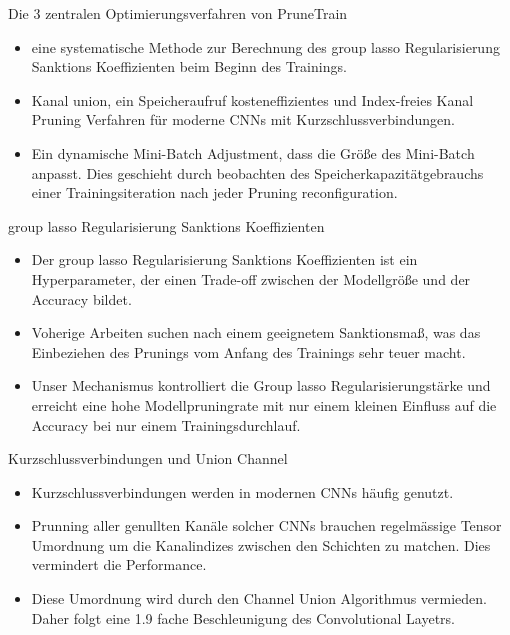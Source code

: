 \documentclass[10pt]{beamer}
\begin{document}
\begin{frame}{Die 3 zentralen Optimierungsverfahren von PruneTrain}
  \begin{itemize}
   \item eine systematische Methode zur Berechnung des group lasso Regularisierung Sanktions Koeffizienten beim Beginn des Trainings.
   \item Kanal union, ein Speicheraufruf kosteneffizientes und Index-freies Kanal Pruning Verfahren für moderne CNNs mit Kurzschlussverbindungen.
   \item Ein dynamische Mini-Batch Adjustment, dass die Größe des Mini-Batch anpasst. Dies geschieht durch beobachten des Speicherkapazitätgebrauchs einer Trainingsiteration nach jeder Pruning reconfiguration.
  \end{itemize} 
  \end{frame}


\begin{frame}{group lasso Regularisierung Sanktions Koeffizienten}
\begin{itemize}
 \item Der group lasso Regularisierung Sanktions Koeffizienten ist ein Hyperparameter, der einen Trade-off  zwischen der Modellgröße und der Accuracy bildet.
 \item Voherige Arbeiten suchen nach einem geeignetem Sanktionsmaß, was das Einbeziehen des Prunings vom Anfang des Trainings sehr teuer macht.
 \item Unser Mechanismus kontrolliert die Group lasso Regularisierungstärke und erreicht eine hohe Modellpruningrate mit nur einem kleinen Einfluss auf die Accuracy bei nur einem Trainingsdurchlauf.
\end{itemize}
\end{frame}


\begin{frame}{Kurzschlussverbindungen und Union Channel}
\begin{itemize}
 \item Kurzschlussverbindungen werden in modernen CNNs häufig genutzt.
 \item Prunning aller genullten Kanäle solcher CNNs brauchen regelmässige Tensor Umordnung um die Kanalindizes zwischen den Schichten zu matchen. Dies vermindert die Performance.
 \item Diese Umordnung wird durch den Channel Union Algorithmus vermieden. Daher folgt eine 1.9 fache Beschleunigung des Convolutional Layetrs.
\end{itemize}
\end{frame}
\end{document}
